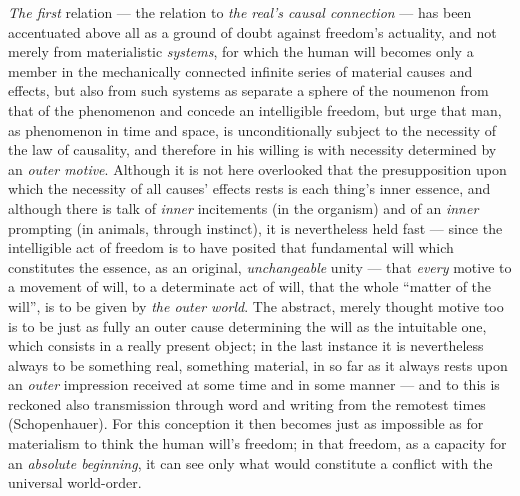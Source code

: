 \documentclass[12pt,a4paper]{book}
\begin{document}
\emph{The first} relation --- the relation to \emph{the real's causal
connection} --- has been accentuated above all as a ground of doubt against
freedom's actuality, and not merely from materialistic \emph{systems}, for
which the human will becomes only a member in the mechanically connected
infinite series of material causes and effects, but also from such systems as
separate a sphere of the noumenon from that of the phenomenon and concede an
intelligible freedom, but urge that man, as phenomenon in time and space, is
unconditionally subject to the necessity of the law of causality, and therefore
in his willing is with necessity determined by an \emph{outer motive}. Although
it is not here overlooked that the presupposition upon which the necessity of
all causes' effects rests is each thing's inner essence, and although there is
talk of \emph{inner} incitements (in the organism) and of an \emph{inner}
prompting (in animals, through instinct), it is nevertheless held fast ---
since the intelligible act of freedom is to have posited that fundamental will
which constitutes the essence, as an original, \emph{unchangeable} unity ---
that \emph{every} motive to a movement of will, to a determinate act of will,
that the whole ``matter of the will'', is to be given by \emph{the outer
world}. The abstract, merely thought motive too is to be just as fully an
outer cause determining the will as the intuitable one, which consists in a
really present object; in the last instance it is nevertheless always to be
something real, something material, in so far as it always rests upon an
\emph{outer} impression received at some time and in some manner --- and to
this is reckoned also transmission through word and writing from the remotest
times (Schopenhauer). For this conception it then becomes just as impossible as
for materialism to think the human will's freedom; in that freedom, as a
capacity for an \emph{absolute beginning}, it can see only what would
constitute a conflict with the universal world-order.
\end{document}
